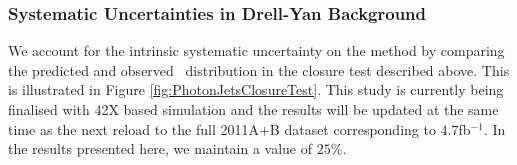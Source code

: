 \subsubsection{Systematic Uncertainties in Drell-Yan Background}

We account for the intrinsic systematic uncertainty on the method by comparing
the predicted and observed \met~distribution in the closure test described above.
This is illustrated in Figure \ref{fig:PhotonJetsClosureTest}. 
This study is currently being finalised with 42X based simulation
and the results will be updated at the same time as the next reload 
to the full 2011A+B dataset corresponding to $4.7$fb$^{-1}$.
In the results presented here, we maintain a value of $25\%$.




